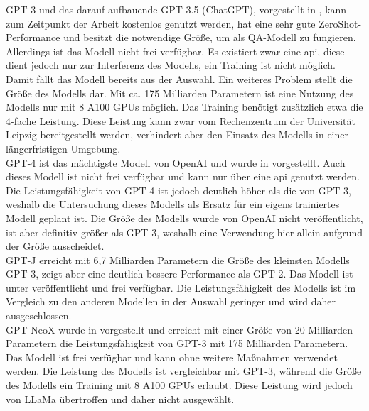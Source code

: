 GPT-3 und das darauf aufbauende GPT-3.5 (ChatGPT), vorgestellt in \citet{gpt3}, kann zum Zeitpunkt der Arbeit kostenlos genutzt werden, hat eine sehr gute ZeroShot-Performance und besitzt die notwendige Größe, um als QA-Modell zu fungieren.
Allerdings ist das Modell nicht frei verfügbar.
Es existiert zwar eine \ac{api}, diese dient jedoch nur zur Interferenz des Modells, ein Training ist nicht möglich.
Damit fällt das Modell bereits aus der Auswahl.
Ein weiteres Problem stellt die Größe des Modells dar.
Mit ca.
175 Milliarden Parametern ist eine Nutzung des Modells nur mit 8 A100 GPUs möglich.
Das Training benötigt zusätzlich etwa die 4-fache Leistung.
Diese Leistung kann zwar vom Rechenzentrum der Universität Leipzig bereitgestellt werden, verhindert aber den Einsatz des Modells in einer längerfristigen Umgebung.\\

GPT-4 ist das mächtigste Modell von OpenAI und wurde in \citet{gpt4} vorgestellt.
Auch dieses Modell ist nicht frei verfügbar und kann nur über eine \ac{api} genutzt werden.
Die Leistungsfähigkeit von GPT-4 ist jedoch deutlich höher als die von GPT-3, weshalb die Untersuchung dieses Modells als Ersatz für ein eigens trainiertes Modell geplant ist.
Die Größe des Modells wurde von OpenAI nicht veröffentlicht, ist aber definitiv größer als GPT-3, weshalb eine Verwendung hier allein aufgrund der Größe ausscheidet.\\

GPT-J erreicht mit 6,7 Milliarden Parametern die Größe des kleinsten Modells GPT-3, zeigt aber eine deutlich bessere Performance als GPT-2.
Das Modell ist unter \citet{gptj} veröffentlicht und frei verfügbar.
Die Leistungsfähigkeit des Modells ist im Vergleich zu den anderen Modellen in der Auswahl geringer und wird daher ausgeschlossen.\\

GPT-NeoX wurde in \citet{gpt_neox} vorgestellt und erreicht mit einer Größe von 20 Milliarden Parametern die Leistungsfähigkeit von GPT-3 mit 175 Milliarden Parametern.
Das Modell ist frei verfügbar und kann ohne weitere Maßnahmen verwendet werden.
Die Leistung des Modells ist vergleichbar mit GPT-3, während die Größe des Modells ein Training mit 8 A100 GPUs erlaubt.
Diese Leistung wird jedoch von LLaMa übertroffen und daher nicht ausgewählt.\\

